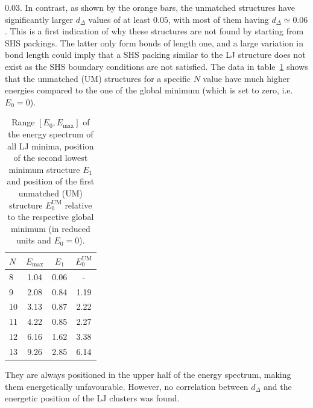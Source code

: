 $0.03$.  In contrast, as shown by the orange bars, the unmatched structures have
significantly larger $d_\Delta$ values of at least $0.05$, with most of them
having $d_{\Delta} \simeq 0.06$. This is a first indication of why these
structures are not found by starting from \ac{SHS} packings. The latter only
form bonds of length one, and a large variation in bond length could imply that
a \ac{SHS} packing similar to the \ac{LJ} structure does not exist as the
\ac{SHS} boundary conditions are not satisfied. The data in
table~\ref{tab:energies} shows that the unmatched (UM) structures for a specific
$N$ value have much higher energies compared to the one of the global minimum
(which is set to zero, i.e. $E_0=0$).
%
\begin{table}[htb]\centering
    \caption{Range $[E_0,E_\text{max}]$ of the energy spectrum of all LJ
    minima, position of the second lowest minimum structure $E_1$ and position
    of the first unmatched (UM) structure $E_0^\text{UM}$ relative to the
    respective global minimum (in reduced units and $E_0=0$).}
    \label{tab:energies}
        \begin{tabular}{lccc}\toprule
        $N$ & $E_\text{max}$ & $E_1$ & $E_0^\text{UM}$ \\\midrule
        8   & 1.04   & 0.06    & -           \\
        9   & 2.08   & 0.84    & 1.19        \\
        10  & 3.13   & 0.87    & 2.22        \\
        11  & 4.22   & 0.85    & 2.27        \\
        12  & 6.16   & 1.62    & 3.38        \\
        13  & 9.26   & 2.85    & 6.14        \\\bottomrule
        \end{tabular}
\end{table}%
%
They are always positioned in the upper half of the energy spectrum, making them
energetically unfavourable. However, no correlation between $d_\Delta$ and the
energetic position of the \ac{LJ} clusters was found.

